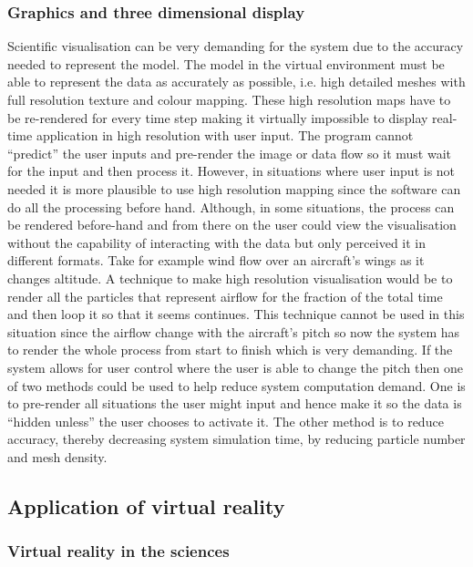 \subsubsection{Graphics and three dimensional display}
Scientific visualisation can be very demanding for the system due to the accuracy needed to represent the model. The model in the virtual environment must be able to represent the data as accurately as possible, i.e. high detailed meshes with full resolution texture and colour mapping. These high resolution maps have to be re-rendered for every time step making it virtually impossible to display real-time application in high resolution with user input. The program cannot ``predict'' the user inputs and pre-render the image or data flow so it must wait for the input and then process it. However, in situations where user input is not needed it is more plausible to use high resolution mapping since the software can do all the processing before hand. Although, in some situations, the process can be rendered before-hand and from there on the user could view the visualisation without the capability of interacting with the data but only perceived it in different formats. Take for example wind flow over an aircraft's wings as it changes altitude. A technique to make high resolution visualisation would be to render all the particles that represent airflow for the fraction of the total time and then loop it so that it seems continues. This technique cannot be used in this situation since the airflow change with the aircraft's pitch so now the system has to render the whole process from start to finish which is very demanding. If the system allows for user control where the user is able to change the pitch then one of two methods could be used to help reduce system computation demand. One is to pre-render all situations the user might input and hence make it so the data is ``hidden unless'' the user chooses to activate it. The other method is to reduce accuracy, thereby decreasing system simulation time, by reducing particle number and mesh density. 


\subsection{Application of virtual reality}

\subsubsection{Virtual reality in the sciences}

